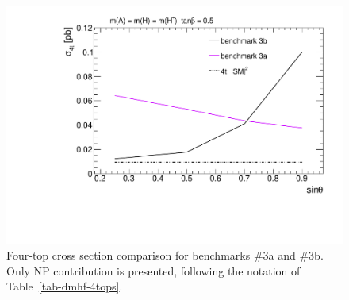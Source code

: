 \begin{figure}
\centering
\includegraphics[width=.8\textwidth]{texinputs/04_grid/figures/DMHF/4tops/WHP_final_stscan.pdf}
\caption{Four-top cross section comparison for benchmarks \#3a and \#3b. Only NP contribution is presented, following the notation of Table~\ref{tab-dmhf-4tops}.}
\label{DMHF-4top-scan3}
\end{figure}

\FloatBarrier